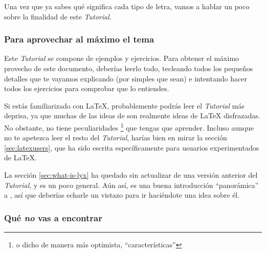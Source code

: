 Una vez que ya sabes qué significa cada tipo de letra, vamos a hablar
un poco sobre la finalidad de este \emph{Tutorial}.


\subsubsection{Para aprovechar al máximo el tema}

Este \emph{Tutorial} se compone de ejemplos y ejercicios. Para obtener
el máximo provecho de este documento, deberías leerlo todo, tecleando
todos los pequeños detalles que te vayamos explicando (por simples
que sean) e intentando hacer todos los ejercicios para comprobar que
lo entiendes. 


Si estás familiarizado con \LaTeX{}, probablemente podrás leer el
\emph{Tutorial} más deprisa, ya que muchas de las ideas de \LyX{}
son realmente ideas de \LaTeX{} disfrazadas. No obstante, \LyX{} no
tiene peculiaridades%
\footnote{o dicho de manera más optimista, {}``características''%
} que tengas que aprender. Incluso aunque no te apetezca leer el resto
del \emph{Tutorial}, harías bien en mirar la sección \ref{sec:latexusers},
que ha sido escrita específicamente para usuarios experimentados de
\LaTeX{}.

La sección \ref{sec:what-is-lyx} ha quedado sin actualizar de una
versión anterior del \emph{Tutorial}, y es un poco general. Aún así,
es una buena introducción {}``panorámica'' a \LyX{}, así que deberías
echarle un vistazo para ir haciéndote una idea sobre él.


\subsubsection{Qué \emph{no} vas a encontrar}

